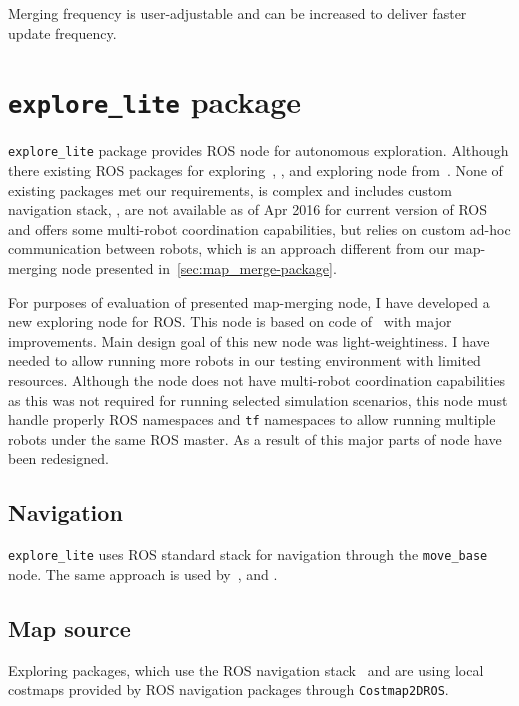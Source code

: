 Merging frequency is user-adjustable and can be increased to deliver faster update frequency.

\section{\texttt{explore\_lite} package} %
\label{sec:explore_lite-package}

\texttt{explore\_lite} package provides \gls{ROS} node for autonomous exploration. Although there existing \gls{ROS} packages for exploring~\cite{2013:RoboCup}, \cite{DuHadway2010}, \cite{Bovbel2010} and exploring node from~\cite{Andre2014}. None of existing packages met our requirements, \cite{2013:RoboCup} is complex and includes custom navigation stack, \cite{DuHadway2010}, \cite{Bovbel2010} are not available as of Apr 2016 for current version of \gls{ROS} and \cite{Andre2014} offers some multi-robot coordination capabilities, but relies on custom ad-hoc communication between robots, which is an approach different from our map-merging node presented in~\ref{sec:map_merge-package}.

For purposes of evaluation of presented map-merging node, I have developed a new exploring node for \gls{ROS}. This node is based on code of~\cite{DuHadway2010} with major improvements. Main design goal of this new node was light-weightiness. I have needed to allow running more robots in our testing environment with limited resources. Although the node does not have multi-robot coordination capabilities as this was not required for running selected simulation scenarios, this node must handle properly \gls{ROS} namespaces and \texttt{tf} namespaces to allow running multiple robots under the same \gls{ROS} master. As a result of this major parts of node have been redesigned.

\subsection{Navigation}

\texttt{explore\_lite} uses \gls{ROS} standard stack for navigation through the \texttt{move\_base} node. The same approach is used by~\cite{DuHadway2010}, \cite{Bovbel2010} and \cite{Andre2014}.

\subsection{Map source}

Exploring packages, which use the \gls{ROS} navigation stack~\cite{Bovbel2010} and \cite{DuHadway2010} are using local costmaps provided by \gls{ROS} navigation packages through \texttt{Costmap2DROS}.

